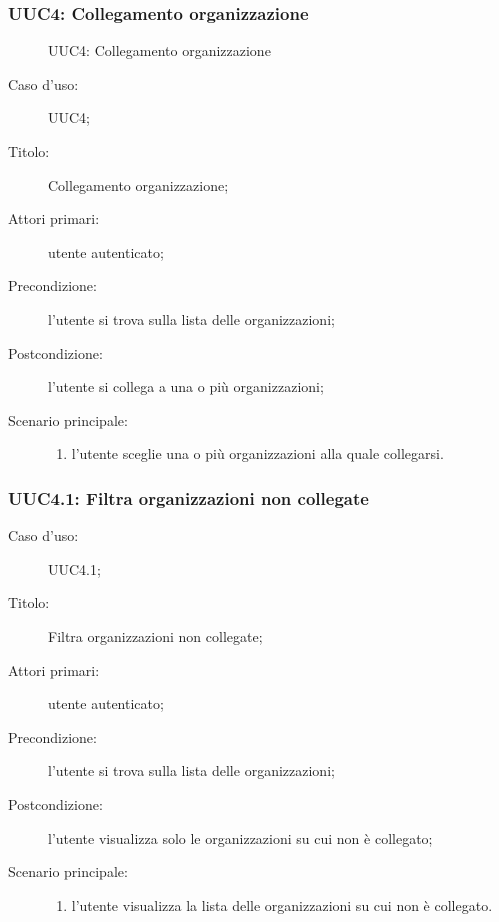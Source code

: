 \documentclass[../../../analisi-dei-requisiti.tex]{subfiles}
\begin{document}
\subsubsection{UUC4: Collegamento organizzazione}%
\label{subs:UUC4}

\begin{figure}[H]
  \centering
  \caption{UUC4: Collegamento organizzazione}%
  \label{fig:UUC4}
\end{figure}

\begin{description}
  \item[Caso d’uso:] UUC4;
  \item[Titolo:] Collegamento organizzazione;
  \item[Attori primari:] utente autenticato;
  \item[Precondizione:] l'utente si trova sulla lista delle organizzazioni;
  \item[Postcondizione:] l'utente si collega a una o più organizzazioni;
  \item[Scenario principale:]
        \begin{enumerate}
          \item l'utente sceglie una o più organizzazioni alla quale collegarsi.
        \end{enumerate}
\end{description}


\subsubsection{UUC4.1: Filtra organizzazioni non collegate}%
\begin{description}
  \item[Caso d’uso:] UUC4.1;
  \item[Titolo:] Filtra organizzazioni non collegate;
  \item[Attori primari:] utente autenticato;
  \item[Precondizione:] l'utente si trova sulla lista delle organizzazioni;
  \item[Postcondizione:] l'utente visualizza solo le organizzazioni su cui non è collegato;
  \item[Scenario principale:]
        \begin{enumerate}
          \item l'utente visualizza la lista delle organizzazioni su cui non è collegato.
        \end{enumerate}
\end{description}
\end{document}

